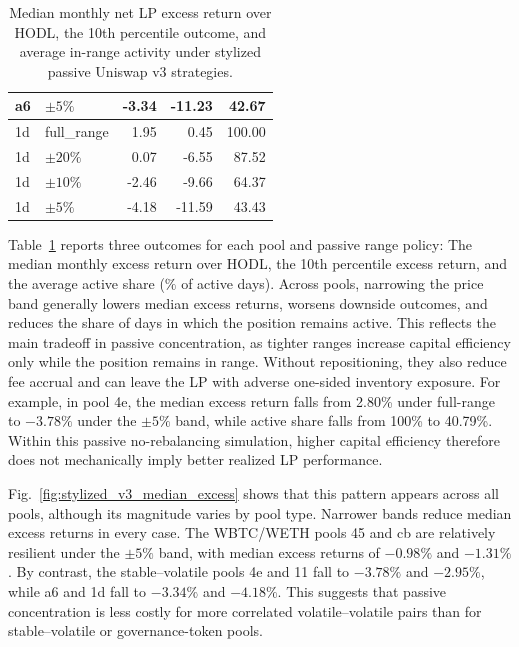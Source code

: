 \documentclass[anonymous]{lipics-v2021}
\begin{document}
{\begin{table}[t]
\begin{tabular}{llrrr}
a6 & $\pm 5\%$  & -3.34 & -11.23 & 42.67 \\
\midrule
1d & full\_range & 1.95 & 0.45 & 100.00 \\
1d & $\pm 20\%$ & 0.07 & -6.55 & 87.52 \\
1d & $\pm 10\%$ & -2.46 & -9.66 & 64.37 \\
1d & $\pm 5\%$  & -4.18 & -11.59 & 43.43 \\
\bottomrule
\end{tabular}
\caption{Median monthly net LP excess return over HODL, the 10th percentile outcome, and average in-range activity under stylized passive Uniswap v3 strategies.}
\label{tab:stylized_v3_results}
\end{table}

Table~\ref{tab:stylized_v3_results} reports three outcomes for each pool and passive range policy: The median monthly excess return over HODL, the 10th percentile excess return, and the average active share ($\%$ of active days). 
Across pools, narrowing the price band generally lowers median excess returns, worsens downside outcomes, and reduces the share of days in which the position remains active. 
This reflects the main tradeoff in passive concentration, as tighter ranges increase capital efficiency only while the position remains in range. Without repositioning, they also reduce fee accrual and can leave the LP with adverse one-sided inventory exposure. 
For example, in pool 4e, the median excess return falls from 2.80\% under full-range to $-3.78\%$ under the $\pm5\%$ band, while active share falls from 100\% to 40.79\%. 
Within this passive no-rebalancing simulation, higher capital efficiency therefore does not mechanically imply better realized LP performance.

Fig.~\ref{fig:stylized_v3_median_excess} shows that this pattern appears across all pools, although its magnitude varies by pool type. 
Narrower bands reduce median excess returns in every case. 
The WBTC/WETH pools 45 and cb are relatively resilient under the $\pm5\%$ band, with median excess returns of $-0.98\%$ and $-1.31\%$. 
By contrast, the stable--volatile pools 4e and 11 fall to $-3.78\%$ and $-2.95\%$, while a6 and 1d fall to $-3.34\%$ and $-4.18\%$. 
This suggests that passive concentration is less costly for more correlated volatile--volatile pairs than for stable--volatile or governance-token pools.

}
\end{document}
